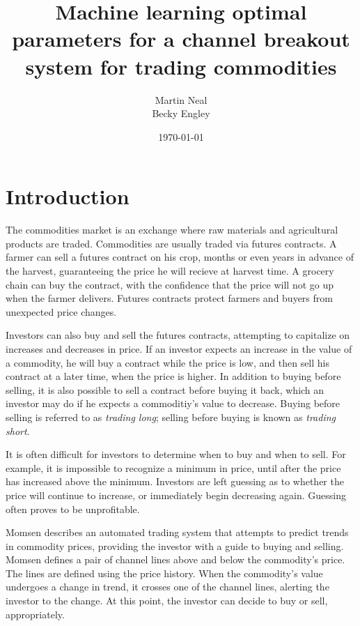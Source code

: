 \documentclass[12pt]{article}
\begin{document}
\title{Machine learning optimal parameters for a channel breakout system for trading
commodities}
\author{Martin Neal\\
  Becky Engley}
\date{\today}
\maketitle

\section{Introduction}

The commodities market is an exchange where raw materials and agricultural
products are traded. Commodities are usually traded via futures contracts. A
farmer can sell a futures contract on his crop, months or even years in advance
of the harvest, guaranteeing the price he will recieve at harvest time. A
grocery chain can buy the contract, with the confidence that the price will not
go up when the farmer delivers. Futures contracts protect farmers and buyers
from unexpected price changes.

Investors can also buy and sell the futures contracts, attempting to capitalize
on increases and decreases in price. If an investor expects an increase in the
value of a commodity, he will buy a contract while the price is low, and then
sell his contract at a later time, when the price is higher. In addition to
buying before selling, it is also possible to sell a contract before buying it
back, which an investor may do if he expects a commoditiy's value to decrease.
Buying before selling is referred to as \emph{trading long}; selling before
buying is known as \emph{trading short}.

It is often difficult for investors to determine when to buy and when to sell.
For example, it is impossible to recognize a minimum in price, until after the
price has increased above the minimum. Investors are left guessing as to
whether the price will continue to increase, or immediately begin decreasing
again. Guessing often proves to be unprofitable.

Momsen describes an automated trading system that attempts to predict trends in
commodity prices, providing the investor with a guide to buying and selling.
Momsen defines a pair of channel lines above and below the commodity's price.
The lines are defined using the price history. When the commodity's value
undergoes a change in trend, it crosses one of the channel lines, alerting the
investor to the change. At this point, the investor can decide to buy or
sell, appropriately.
\end{document}

